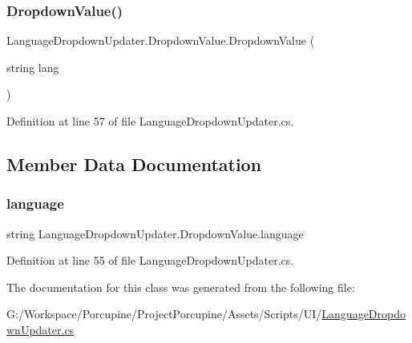 \subsubsection{\texorpdfstring{Dropdown\+Value()}{DropdownValue()}}
{\footnotesize\ttfamily Language\+Dropdown\+Updater.\+Dropdown\+Value.\+Dropdown\+Value (\begin{DoxyParamCaption}\item[{string}]{lang }\end{DoxyParamCaption})}



Definition at line 57 of file Language\+Dropdown\+Updater.\+cs.



\subsection{Member Data Documentation}
\mbox{\label{class_language_dropdown_updater_1_1_dropdown_value_a88e9f47be967123c364791c6990863b4}} 
\subsubsection{\texorpdfstring{language}{language}}
{\footnotesize\ttfamily string Language\+Dropdown\+Updater.\+Dropdown\+Value.\+language}



Definition at line 55 of file Language\+Dropdown\+Updater.\+cs.



The documentation for this class was generated from the following file\+:\begin{DoxyCompactItemize}
\item 
G\+:/\+Workspace/\+Porcupine/\+Project\+Porcupine/\+Assets/\+Scripts/\+U\+I/\hyperlink{_language_dropdown_updater_8cs}{Language\+Dropdown\+Updater.\+cs}\end{DoxyCompactItemize}
